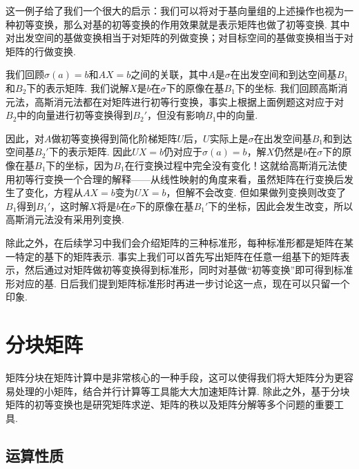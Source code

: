 这一例子给了我们一个很大的启示：我们可以将对于基向量组的上述操作也视为一种初等变换，那么对基的初等变换的作用效果就是表示矩阵也做了初等变换. 其中对出发空间的基做变换相当于对矩阵的列做变换；对目标空间的基做变换相当于对矩阵的行做变换.

我们回顾$\sigma(a)=b$和$AX=b$之间的关联，其中$A$是$\sigma$在出发空间和到达空间基$B_1$和$B_2$下的表示矩阵. 我们说解$X$是$b$在$\sigma$下的原像在基$B_1$下的坐标. 我们回顾高斯消元法，高斯消元法都在对矩阵进行初等行变换，事实上根据上面例题这对应于对$B_2$中的向量进行初等变换得到$B_2'$，但没有影响$B_1$中的向量.

因此，对$A$做初等变换得到简化阶梯矩阵$U$后，$U$实际上是$\sigma$在出发空间基$B_1$和到达空间基$B_2'$下的表示矩阵. 因此$UX=b$仍对应于$\sigma(a)=b$，解$X$仍然是$b$在$\sigma$下的原像在基$B_1$下的坐标，因为$B_1$在行变换过程中完全没有变化！这就给高斯消元法使用初等行变换一个合理的解释——从线性映射的角度来看，虽然矩阵在行变换后发生了变化，方程从$AX=b$变为$UX=b$，但解不会改变. 但如果做列变换则改变了$B_1$得到$B_1'$，这时解$X$将是$b$在$\sigma$下的原像在基$B_1'$下的坐标，因此会发生改变，所以高斯消元法没有采用列变换.

除此之外，在后续学习中我们会介绍矩阵的三种标准形，每种标准形都是矩阵在某一特定的基下的矩阵表示. 事实上我们可以首先写出矩阵在任意一组基下的矩阵表示，然后通过对矩阵做初等变换得到标准形，同时对基做``初等变换''即可得到标准形对应的基. 日后我们提到矩阵标准形时再进一步讨论这一点，现在可以只留一个印象.

\section{分块矩阵}

矩阵分块在矩阵计算中是非常核心的一种手段，这可以使得我们将大矩阵分为更容易处理的小矩阵，结合并行计算等工具能大大加速矩阵计算. 除此之外，基于分块矩阵的初等变换也是研究矩阵求逆、矩阵的秩以及矩阵分解等多个问题的重要工具.

\subsection{运算性质}

